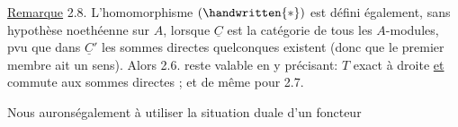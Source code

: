 \uline{Remarque} 2.8. L'homomorphisme $(\handwritten{*})$ est défini également, sans hypothèse
noethéenne sur $A$, lorsque $\underline C$ est la catégorie de tous les $A$-modules,
pvu que dans $\underline C'$ les sommes directes quelconques existent (donc que
le premier membre ait un sens). Alors 2.6.  reste valable en y
précisant: $T$ exact à droite \uline{et} commute aux sommes directes ; et de même
pour 2.7.

Nous auronségalement à utiliser la situation duale d'un foncteur

